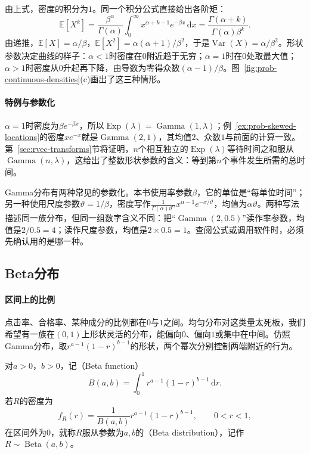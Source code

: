 由上式，密度的积分为$1$。同一个积分公式直接给出各阶矩：
\[
  \mathbb{E}[X^k]=\frac{\beta^\alpha}{\Gamma(\alpha)}\int_0^\infty x^{\alpha+k-1}e^{-\beta x}\,\mathrm{d}x=\frac{\Gamma(\alpha+k)}{\Gamma(\alpha)\beta^k}.
\]
由递推，$\mathbb{E}[X]=\alpha/\beta$，$\mathbb{E}[X^2]=\alpha(\alpha+1)/\beta^2$，于是$\operatorname{Var}(X)=\alpha/\beta^2$。形状参数决定曲线的样子：$\alpha<1$时密度在$0$附近趋于无穷；$\alpha=1$时在$0$处取最大值；$\alpha>1$时密度从$0$升起再下降，由导数为零得众数$(\alpha-1)/\beta$。图~\ref{fig:prob-continuous-densities}(c)画出了这三种情形。

\paragraph{特例与参数化}
$\alpha=1$时密度为$\beta e^{-\beta x}$，所以$\operatorname{Exp}(\lambda)=\operatorname{Gamma}(1,\lambda)$；例~\ref{ex:prob-skewed-locations}的密度$xe^{-x}$就是$\operatorname{Gamma}(2,1)$，其均值$2$、众数$1$与前面的计算一致。第~\ref{sec:rvec-transforms}节将证明，$n$个相互独立的$\operatorname{Exp}(\lambda)$等待时间之和服从$\operatorname{Gamma}(n,\lambda)$，这给出了整数形状参数的含义：等到第$n$个事件发生所需的总时间。

Gamma分布有两种常见的参数化。本书使用率参数$\beta$，它的单位是“每单位时间”；另一种使用尺度参数$\vartheta=1/\beta$，密度写作$\frac{1}{\Gamma(\alpha)\vartheta^\alpha}x^{\alpha-1}e^{-x/\vartheta}$，均值为$\alpha\vartheta$。两种写法描述同一族分布，但同一组数字含义不同：把“$\operatorname{Gamma}(2,0.5)$”读作率参数，均值是$2/0.5=4$；读作尺度参数，均值是$2\times0.5=1$。查阅公式或调用软件时，必须先确认用的是哪一种。

\subsection{Beta分布}
\label{sec:prob-beta}

\paragraph{区间上的比例}
点击率、合格率、某种成分的比例都在$0$与$1$之间。均匀分布对这类量太死板，我们希望有一族在$(0,1)$上形状灵活的分布，能偏向$0$、偏向$1$或集中在中间。仿照Gamma分布，取$r^{a-1}(1-r)^{b-1}$的形状，两个幂次分别控制两端附近的行为。

\begin{definition}[Beta分布]
\label{def:prob-beta}
对$a>0$，$b>0$，记（Beta function）
\[
  B(a,b)=\int_0^1r^{a-1}(1-r)^{b-1}\,\mathrm{d}r .
\]
若$R$的密度为
\[
  f_R(r)=\frac{1}{B(a,b)}r^{a-1}(1-r)^{b-1},\qquad 0<r<1,
\]
在区间外为$0$，就称$R$服从参数为$a,b$的（Beta distribution），记作$R\sim\operatorname{Beta}(a,b)$。
\end{definition}

